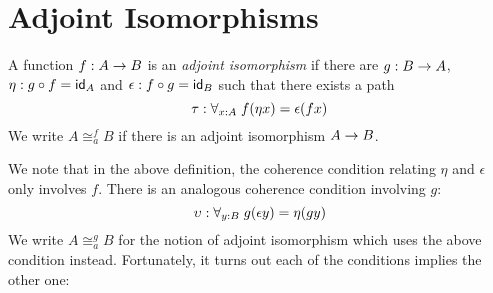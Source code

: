 \section{Adjoint  Isomorphisms}

\begin{defn} A function $f:A\ra B$ is an {\em adjoint isomorphism} if there are $g:B\ra A$, $\eta: g \circ f = \idfunc[A]$ and $\epsilon:f \circ g = \idfunc[B]$ such that there exists a path
  \[\tau : \forall_{x:A}\;\map{f}{\eta x} = \epsilon(fx)\]
We write $A\cong^f_a B$ if there is an adjoint isomorphism $A\ra B$.
\end{defn}
We note that in the above definition, the coherence condition relating $\eta$ and $\epsilon$ only involves $f$. There is an analogous coherence condition involving $g$:
  \[\upsilon : \forall_{y:B}\; \map{g}{\epsilon y} = \eta(gy)\]
We write $A\cong^g_a B$ for the notion of adjoint isomorphism which uses the above condition instead. Fortunately, it turns out each of the conditions implies the other one:

